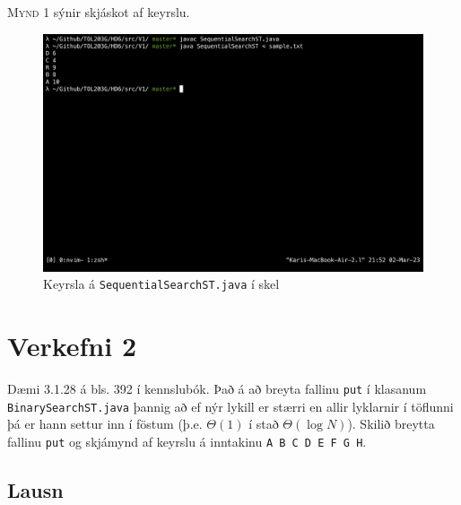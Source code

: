 \documentclass[12pt, a4paper, hidelinks]{article}
\begin{document}
\textsc{Mynd 1} sýnir skjáskot af keyrslu.
\begin{figure}[H]
   \centering
   \includegraphics[width=\textwidth]{img/v1-keyrsla.png}
   \caption{Keyrsla á \texttt{SequentialSearchST.java} í skel}
\end{figure}

\newpage

\section*{Verkefni 2}
Dæmi 3.1.28 á bls. 392 í kennslubók. Það á að breyta fallinu \texttt{put} í klasanum
\texttt{BinarySearchST.java} þannig að ef nýr lykill er stærri en allir lyklarnir í töflunni
þá er hann settur inn í föstum (þ.e. $\Theta(1)$ í stað $\Theta(\log N)$). Skilið breytta fallinu
\texttt{put} og skjámynd af keyrslu á inntakinu \texttt{A B C D E F G H}.

\subsection*{Lausn}
\end{document}
